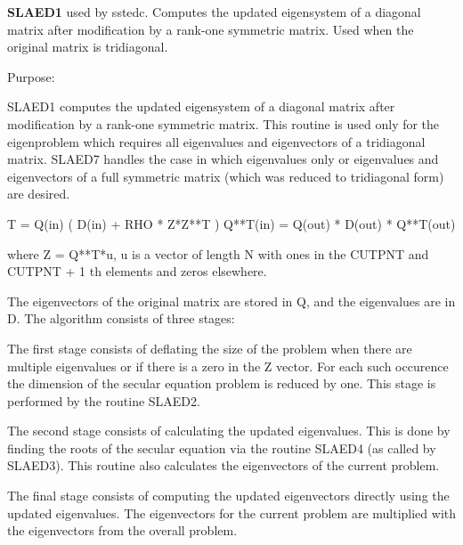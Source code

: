 {\bfseries S\+L\+A\+E\+D1} used by sstedc. Computes the updated eigensystem of a diagonal matrix after modification by a rank-\/one symmetric matrix. Used when the original matrix is tridiagonal. 

 \begin{DoxyParagraph}{Purpose\+: }
\begin{DoxyVerb} SLAED1 computes the updated eigensystem of a diagonal
 matrix after modification by a rank-one symmetric matrix.  This
 routine is used only for the eigenproblem which requires all
 eigenvalues and eigenvectors of a tridiagonal matrix.  SLAED7 handles
 the case in which eigenvalues only or eigenvalues and eigenvectors
 of a full symmetric matrix (which was reduced to tridiagonal form)
 are desired.

   T = Q(in) ( D(in) + RHO * Z*Z**T ) Q**T(in) = Q(out) * D(out) * Q**T(out)

    where Z = Q**T*u, u is a vector of length N with ones in the
    CUTPNT and CUTPNT + 1 th elements and zeros elsewhere.

    The eigenvectors of the original matrix are stored in Q, and the
    eigenvalues are in D.  The algorithm consists of three stages:

       The first stage consists of deflating the size of the problem
       when there are multiple eigenvalues or if there is a zero in
       the Z vector.  For each such occurence the dimension of the
       secular equation problem is reduced by one.  This stage is
       performed by the routine SLAED2.

       The second stage consists of calculating the updated
       eigenvalues. This is done by finding the roots of the secular
       equation via the routine SLAED4 (as called by SLAED3).
       This routine also calculates the eigenvectors of the current
       problem.

       The final stage consists of computing the updated eigenvectors
       directly using the updated eigenvalues.  The eigenvectors for
       the current problem are multiplied with the eigenvectors from
       the overall problem.\end{DoxyVerb}
 
\end{DoxyParagraph}

